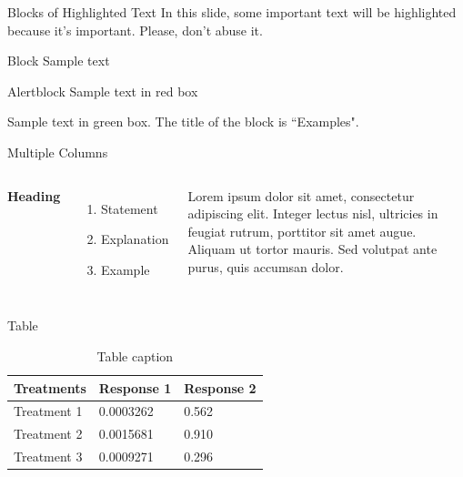 \documentclass[aspectratio=169,xcolor=dvipsnames]{beamer}
\begin{document}

\begin{frame}{Blocks of Highlighted Text}
    In this slide, some important text will be \alert{highlighted} because it's important. Please, don't abuse it.

    \begin{block}{Block}
        Sample text
    \end{block}

    \begin{alertblock}{Alertblock}
        Sample text in red box
    \end{alertblock}

    \begin{examples}
        Sample text in green box. The title of the block is ``Examples".
    \end{examples}
\end{frame}


\begin{frame}{Multiple Columns}
    \begin{columns}[c] %

        \textbf{Heading}
        \begin{enumerate}
            \item Statement
            \item Explanation
            \item Example
        \end{enumerate}

        Lorem ipsum dolor sit amet, consectetur adipiscing elit. Integer lectus nisl, ultricies in feugiat rutrum, porttitor sit amet augue. Aliquam ut tortor mauris. Sed volutpat ante purus, quis accumsan dolor.

    \end{columns}
\end{frame}

\begin{frame}{Table}
    \begin{table}
        \begin{tabular}{l l l}
            \toprule
            \textbf{Treatments} & \textbf{Response 1} & \textbf{Response 2} \\
            \midrule
            Treatment 1         & 0.0003262           & 0.562               \\
            Treatment 2         & 0.0015681           & 0.910               \\
            Treatment 3         & 0.0009271           & 0.296               \\
            \bottomrule
        \end{tabular}
        \caption{Table caption}
    \end{table}
\end{frame}
\end{document}
